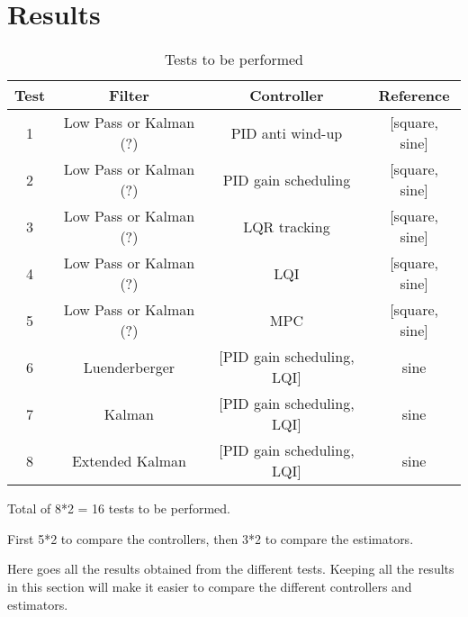 \section{Results}
\label{sec:results}

\begin{table}
    \centering

    \begin{tabular}{|c|c|c|c|}
        \hline
        \textbf{Test} & \textbf{Filter}        & \textbf{Controller}        & \textbf{Reference} \\
        \hline
        1             & Low Pass or Kalman (?) & PID anti wind-up           & [square, sine]     \\
        2             & Low Pass or Kalman (?) & PID gain scheduling        & [square, sine]     \\
        3             & Low Pass or Kalman (?) & LQR tracking               & [square, sine]     \\
        4             & Low Pass or Kalman (?) & LQI                        & [square, sine]     \\
        5             & Low Pass or Kalman (?) & MPC                        & [square, sine]     \\
        \hline
        6             & Luenderberger          & [PID gain scheduling, LQI] & sine               \\
        7             & Kalman                 & [PID gain scheduling, LQI] & sine               \\
        8             & Extended Kalman        & [PID gain scheduling, LQI] & sine               \\
        \hline
    \end{tabular}

    \caption{Tests to be performed}
    \label{tab:tests}

\end{table}

Total of 8*2 = 16 tests to be performed.

First 5*2 to compare the controllers, then 3*2 to compare the estimators.



Here goes all the results obtained from the different tests.
Keeping all the results in this section will make it easier to compare the different controllers and estimators.